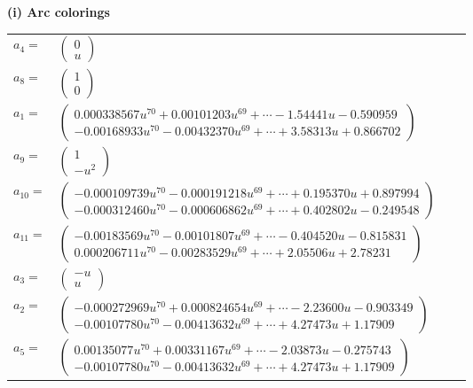 \documentclass[1p]{elsarticle_modified}
\theoremstyle{definition}
\begin{document}
\flushleft \textbf{(i) Arc colorings}\\
\begin{tabular}{m{7pt} m{180pt} m{7pt} m{180pt} }
\flushright $a_{4}=$&$\begin{pmatrix}0\\u\end{pmatrix}$ \\
\flushright $a_{8}=$&$\begin{pmatrix}1\\0\end{pmatrix}$ \\
\flushright $a_{1}=$&$\begin{pmatrix}0.000338567 u^{70}+0.00101203 u^{69}+\cdots-1.54441 u-0.590959\\-0.00168933 u^{70}-0.00432370 u^{69}+\cdots+3.58313 u+0.866702\end{pmatrix}$ \\
\flushright $a_{9}=$&$\begin{pmatrix}1\\- u^2\end{pmatrix}$ \\
\flushright $a_{10}=$&$\begin{pmatrix}-0.000109739 u^{70}-0.000191218 u^{69}+\cdots+0.195370 u+0.897994\\-0.000312460 u^{70}-0.000606862 u^{69}+\cdots+0.402802 u-0.249548\end{pmatrix}$ \\
\flushright $a_{11}=$&$\begin{pmatrix}-0.00183569 u^{70}-0.00101807 u^{69}+\cdots-0.404520 u-0.815831\\0.000206711 u^{70}-0.00283529 u^{69}+\cdots+2.05506 u+2.78231\end{pmatrix}$ \\
\flushright $a_{3}=$&$\begin{pmatrix}- u\\u\end{pmatrix}$ \\
\flushright $a_{2}=$&$\begin{pmatrix}-0.000272969 u^{70}+0.000824654 u^{69}+\cdots-2.23600 u-0.903349\\-0.00107780 u^{70}-0.00413632 u^{69}+\cdots+4.27473 u+1.17909\end{pmatrix}$ \\
\flushright $a_{5}=$&$\begin{pmatrix}0.00135077 u^{70}+0.00331167 u^{69}+\cdots-2.03873 u-0.275743\\-0.00107780 u^{70}-0.00413632 u^{69}+\cdots+4.27473 u+1.17909\end{pmatrix}$ \\

\end{tabular}
\end{document}
